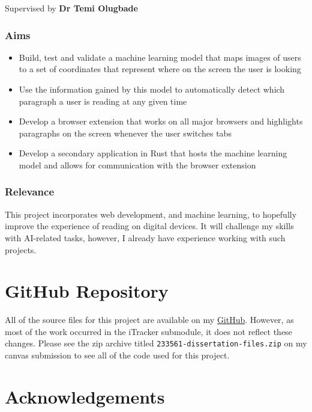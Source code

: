\documentclass{report}
\begin{document}
\vspace{0.5cm}

\noindent
Supervised by \textbf{Dr Temi Olugbade} 

\vspace{0.5cm}

\subsection*{Aims}

\begin{itemize}
    \item Build, test and validate a machine learning model that maps images of users to a set of coordinates that represent where on the screen the user is looking 
    \item Use the information gained by this model to automatically detect which paragraph a user is reading at any given time 
    \item Develop a browser extension that works on all major browsers and highlights paragraphs on the screen whenever the user switches tabs 
    \item Develop a secondary application in Rust that hosts the machine learning model and allows for communication with the browser extension 
\end{itemize}

\subsection*{Relevance}

This project incorporates web development, and machine learning, to hopefully improve the experience of reading on digital devices. It will challenge my skills with AI-related tasks, however, I already have experience working with such projects. 

\chapter{GitHub Repository}

All of the source files for this project are available on my \href{https://github.com/Henry-Ash-Williams}{GitHub}. However, as most of the work occurred in the iTracker submodule, it does not reflect these changes. Please see the zip archive titled \texttt{233561-dissertation-files.zip} on my canvas submission to see all of the code used for this project. 

\chapter{Acknowledgements}
\end{document}
